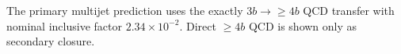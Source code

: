The primary multijet prediction uses the exactly $3b\rightarrow{\geq4b}$ QCD transfer with nominal inclusive factor $2.34\times10^{-2}$. Direct $\geq4b$ QCD is shown only as secondary closure.
